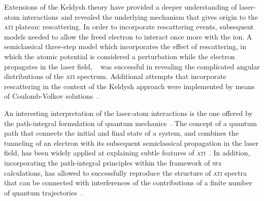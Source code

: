 Extensions of the Keldysh theory have provided a deeper understanding
of laser-atom interactions and revealed the underlying mechanism that
gives origin to the \textsc{ati} plateau: rescattering. In order to
incorporate rescattering events, subsequent models needed to allow the
freed electron to interact once more with the ion. A semiclassical
three-step model which incorporates the effect of rescattering, in
which the atomic potential is considered a perturbation while the
electron propagates in the laser field,
~\cite{Becker_rescattering1994,Becker_1994plateau_classical} was
successful in revealing the complicated angular distributions of the
\textsc{ati} spectrum. Additional attempts that incorporate
rescattering in the context of the Keldysh approach were implemented
by means of Coulomb-Volkov solutions~\cite{Kaminski_1997}.


An interesting interpretation of the laser-atom interactions is the
one offered by the path-integral formulation of quantum
mechanics~\cite{RevModPhysFeynman}. The concept of a quantum path that
connects the initial and final state of a system, and combines the
tunneling of an electron with its subsequent semiclassical propagation
in the laser field, has been widely applied at explaining subtle
features of \textsc{ati}~\cite{LewScience2001}. In addition,
incorporating the path-integral principles within the framework of
\textsc{sfa} calculations, has allowed to successfully reproduce the
structure of \textsc{ati} spectra that can be connected with
interferences of the contributions of a finite number of quantum
trajectories~\cite{KopoldOptComm2000}.



